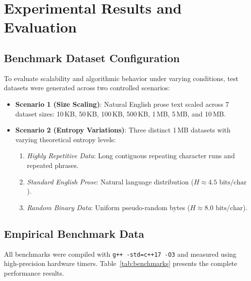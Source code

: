 \documentclass[12pt,a4paper]{article}
\begin{document}
\section{Experimental Results and Evaluation}

\subsection{Benchmark Dataset Configuration}
To evaluate scalability and algorithmic behavior under varying conditions, test datasets were generated across two controlled scenarios:
\begin{itemize}
    \item \textbf{Scenario 1 (Size Scaling)}: Natural English prose text scaled across 7 dataset sizes: 10\,KB, 50\,KB, 100\,KB, 500\,KB, 1\,MB, 5\,MB, and 10\,MB.
    \item \textbf{Scenario 2 (Entropy Variations)}: Three distinct 1\,MB datasets with varying theoretical entropy levels:
    \begin{enumerate}
        \item \textit{Highly Repetitive Data}: Long contiguous repeating character runs and repeated phrases.
        \item \textit{Standard English Prose}: Natural language distribution ($H \approx 4.5\text{ bits/char}$).
        \item \textit{Random Binary Data}: Uniform pseudo-random bytes ($H \approx 8.0\text{ bits/char}$).
    \end{enumerate}
\end{itemize}

\subsection{Empirical Benchmark Data}
All benchmarks were compiled with \texttt{g++ -std=c++17 -O3} and measured using high-precision hardware timers. Table~\ref{tab:benchmarks} presents the complete performance results.
\end{document}
